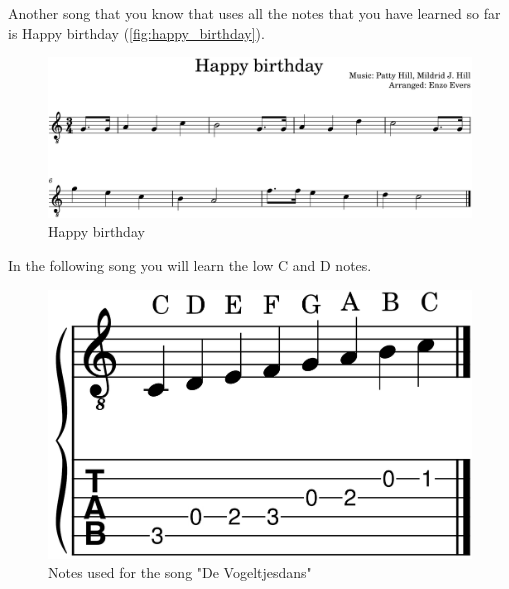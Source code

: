 Another song that you know that uses all the notes that you have learned so far is Happy birthday (\autoref{fig:happy_birthday}). 

\begin{figure}[h]
	\centering
	\includegraphics[width=\textwidth]{../../MuseScore/Guitar/GuitarHappyBirthday.png}
	\caption{Happy birthday}
	\label{fig:happy_birthday}
\end{figure}

\newpage

In the following song you will learn the low C and D notes.

\begin{figure}[h]
	\centering
	\includegraphics[height=0.12\textheight]{../../MuseScore/Guitar/GuitarNotesUsedInVogeltjesdans.png}
	\caption{Notes used for the song "De Vogeltjesdans"}
	\label{fig:guitar_notes_for_vogeltjesdans}
\end{figure}



